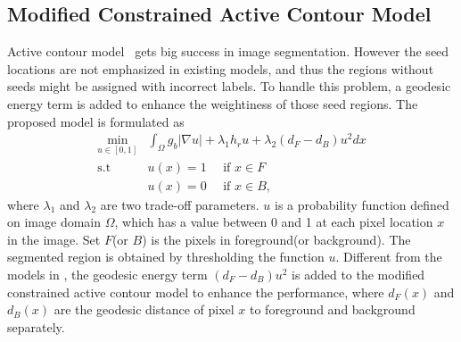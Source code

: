 \documentclass{article}
\begin{document}
\subsection{Modified Constrained Active Contour Model}
%
Active contour model~\cite{GoldsteinBO10,nguyen2012robust} gets big success in image segmentation. However the seed locations are not emphasized in existing models, and thus the regions without seeds might be assigned with incorrect labels. To handle this problem, a geodesic energy term is added to enhance the weightiness of those seed regions. The proposed model is formulated as
\begin{equation} \label{eq:newmodel}
\begin{array}{rl}
   \underset{u\in[0,1]}{ \min}  & \int_\Omega{g_b|\nabla u|+\lambda_1h_ru+\lambda_2(d_F-d_B)u^2dx} \\
   \textrm{s.t} & u(x) = 1 ~~~~~~ \textrm{if $x\in F$}\\
& u(x) = 0  ~~~~~~ \textrm{if $x\in B$},
\end{array}
\end{equation}
%
where $\lambda_1$ and $\lambda_2$ are two trade-off parameters. $u$ is a probability function defined on image domain $\Omega$, which has a value between 0 and 1 at each pixel location $x$ in the image. Set $F$(or $B$) is the pixels in foreground(or background). The segmented region is obtained by thresholding the function $u$. Different from the models in \cite{GoldsteinBO10,nguyen2012robust}, the geodesic energy term $(d_F-d_B)u^2$ is added to the modified constrained active contour model to enhance the performance, where $d_F(x)$ and $d_B(x)$ are the geodesic distance of pixel $x$ to foreground and background \cite{bai2007geodesic} separately.
\end{document}
